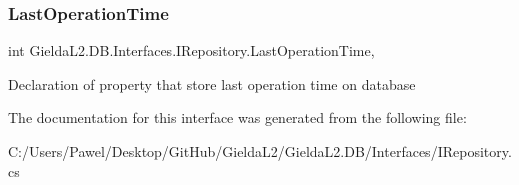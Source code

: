 \subsubsection{\texorpdfstring{LastOperationTime}{LastOperationTime}}
{\footnotesize\ttfamily int Gielda\+L2.\+D\+B.\+Interfaces.\+I\+Repository.\+Last\+Operation\+Time\hspace{0.3cm}{\ttfamily [get]}, {\ttfamily [set]}}



Declaration of property that store last operation time on database 



The documentation for this interface was generated from the following file\+:\begin{DoxyCompactItemize}
\item 
C\+:/\+Users/\+Pawel/\+Desktop/\+Git\+Hub/\+Gielda\+L2/\+Gielda\+L2.\+D\+B/\+Interfaces/I\+Repository.\+cs\end{DoxyCompactItemize}

